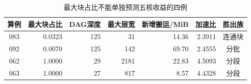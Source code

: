 \begin{table}[htbp]\centering
\caption{最大块占比不能单独预测五核收益的四例}\label{tab:q1-counterexamples}
\small\begin{tabular}{crrrrrc}\toprule
算例 & 最大块占比 & DAG深度 & 最大层宽 & 新增搬运/MiB & 加速比 & 胜出族 \\ \midrule
083 & 0.0323 & 125 & 31 & 14.36 & 2.3911 & 连通块 \\
092 & 0.0070 & 125 & 142 & 69.70 & 2.4555 & 分批 \\
062 & 1.0000 & 29 & 2181 & 22.83 & 4.5093 & 分段 \\
063 & 1.0000 & 27 & 817 & 8.57 & 4.4328 & 分段 \\
\bottomrule\end{tabular}\end{table}
